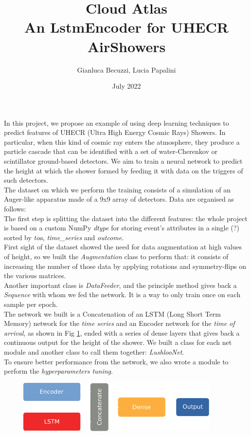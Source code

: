 \documentclass{article}
\title{Cloud Atlas \\[1ex] \large An LstmEncoder for UHECR AirShowers}
\author{Gianluca Becuzzi, Lucia Papalini}
\date{July 2022}
\begin{document}
\maketitle

In this project, we propose an example of using deep learning techniques to predict features of UHECR 
(Ultra High Energy Cosmic Rays) Showers.
In particular, when this kind of cosmic ray enters the atmosphere, they produce a particle cascade 
that can be identified with a set of water-Cherenkov or scintillator ground-based detectors. We aim to train a neural network to predict the height at which the shower formed by feeding it with data on the triggers of such detectors.\\
The dataset on which we perform the training consists of a simulation of an Auger-like apparatus 
made of a 9x9 array of detectors.  Data are organised as follows:
\\
The first step is splitting the dataset into the different features: the whole project is based on a custom NumPy \textit{dtype} for storing event's attributes in a single (?) sorted by \textit{toa}, \textit{time\_series} and \textit{outcome}.\\
First sight of the dataset showed the need for data augmentation at high values of height, so we built the \textit{Augmentation} class to perform that: it consists of increasing the number of those data by applying rotations and symmetry-flips on the various matrices.\\
Another important class is \textit{DataFeeder}, and the principle method gives back a \textit{Sequence} 
with whom we fed the network. It is a way to only train once on each sample per epoch.\\
The network we built is a Concatenation of an LSTM (Long Short Term Memory) network for the \textit{time series} and an Encoder network for the \textit{time of arrival}, as shown in Fig \ref{fig:network}, ended with a series of dense layers that gives back a continuous output for the height of the shower. We built a class for each net module and another class to call them together: \textit{LushlooNet}.\\
To ensure better performance from the network, we also wrote a module to perform the \textit{hyperparameters tuning}.
\begin{figure}
    \centering
    \includegraphics[width=0.9\textwidth]{figures/net_idea.pdf}
    \caption{}
    \label{fig:network}
\end{figure}
\end{document}
